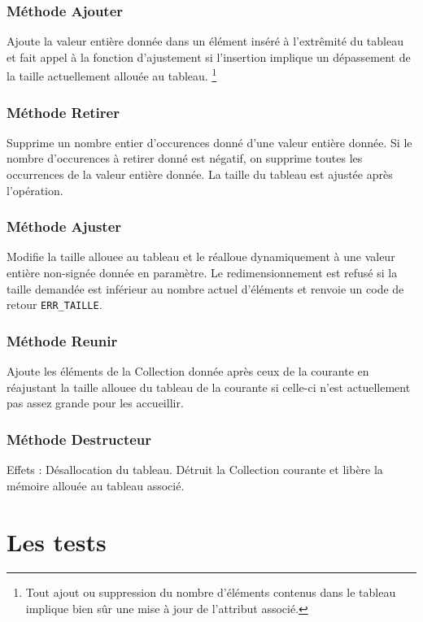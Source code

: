 \documentclass[11pt]{article}
\begin{document}
\subsubsection*{Méthode Ajouter}
Ajoute la valeur entière donnée dans un élément inséré à l'extrêmité du tableau et fait appel à la fonction d'ajustement si l'insertion implique un dépassement de la taille actuellement allouée au tableau.
\footnote{Tout ajout ou suppression du nombre d'éléments contenus dans le tableau implique bien sûr une mise à jour de l'attribut associé.}

\subsubsection*{Méthode Retirer}
Supprime un nombre entier d'occurences donné d'une valeur entière donnée. Si le nombre d'occurences à retirer donné est négatif, on supprime toutes les occurrences de la valeur entière donnée. La taille du tableau est ajustée après l'opération. 

\subsubsection*{Méthode Ajuster}
Modifie la taille allouee au tableau et le réalloue dynamiquement à une valeur entière non-signée donnée en paramètre. Le redimensionnement est refusé si la taille demandée est inférieur au nombre actuel d'éléments et renvoie un code de retour \texttt{ERR\_TAILLE}.
    
\subsubsection*{Méthode Reunir}
Ajoute les éléments de la Collection donnée après ceux de la courante en réajustant la taille allouee du tableau de la courante si celle-ci n'est actuellement pas assez grande pour les accueillir.

\subsubsection*{Méthode Destructeur}

\noindent Effets : Désallocation du tableau.
Détruit la Collection courante et libère la mémoire allouée au tableau associé.
\newpage


\section{Les tests}
\end{document}
